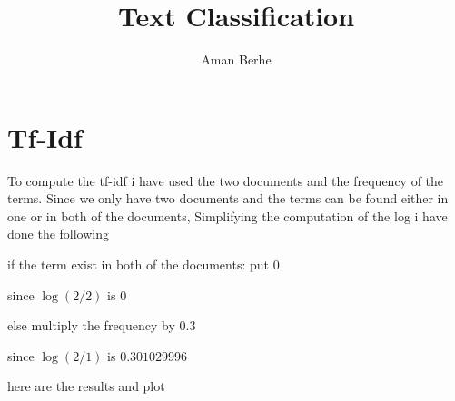 \documentclass{article}
\title{Text Classification }
\author{Aman Berhe}
\begin{document}
\maketitle
\newpage

\section{Tf-Idf}

To compute the tf-idf i have used the two documents and the frequency of the terms. Since we only have two documents and the terms can be found either in one or in both of the documents, Simplifying the computation of the log i have done the following

if the term exist in both of the documents: put 0

		since $\log(2/2)$ is $0$
		
else multiply the frequency by $0.3$

		since $\log(2/1)$ is $0.301029996$
		
here are the results and plot
\end{document}
